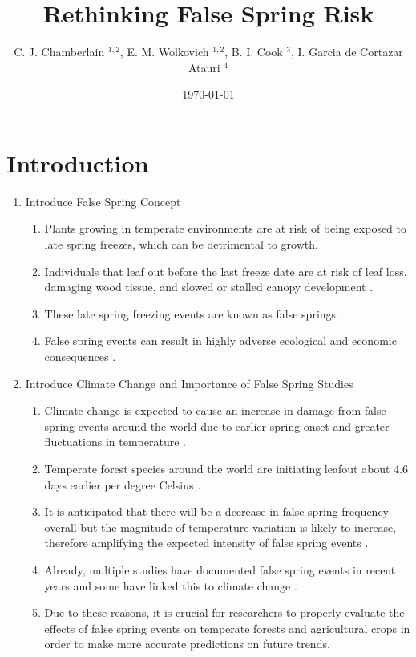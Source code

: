 \documentclass{article}\usepackage[]{graphicx}\usepackage[]{color}
\begin{document}
\title{Rethinking False Spring Risk}
\author{C. J. Chamberlain $^{1,2}$, E. M. Wolkovich $^{1,2}$, B. I. Cook $^{3}$, I. Garcia de Cortazar Atauri $^{4}$}
\date{\today}
\maketitle 
 

\renewcommand{\thetable}{\arabic{table}}
\renewcommand{\thefigure}{\arabic{figure}}
\renewcommand{\labelitemi}{$-$}

\section*{Introduction}
\begin{enumerate}
\item Introduce False Spring Concept
\begin {enumerate}
\item Plants growing in temperate environments are at risk of being exposed to late spring freezes, which can be detrimental to growth. 
\item Individuals that leaf out before the last freeze date are at risk of leaf loss, damaging wood tissue, and slowed or stalled canopy development \citep{Gu2008, Hufkens2012}. 
\item These late spring freezing events are known as false springs. 
\item False spring events can result in highly adverse ecological and economic consequences \citep{Knudson2012, Ault2013}.
\end{enumerate}

\item Introduce Climate Change and Importance of False Spring Studies
\begin{enumerate}
\item Climate change is expected to cause an increase in damage from false spring events around the world due to earlier spring onset and greater fluctuations in temperature \citep{Cannell1986, Inouye2008, Martin2010}. 
\item Temperate forest species around the world are initiating leafout about 4.6 days earlier per degree Celsius \citep{Wolkovich2012, Polgar2014}. 
\item It is anticipated that there will be a decrease in false spring frequency overall but the magnitude of temperature variation is likely to increase, therefore amplifying the expected intensity of false spring events \citep{Kodra2011, Allstadt2015}. 
\item Already, multiple studies have documented false spring events in recent years \citep{Gu2008, Augspurger2009, Knudson2012, Augspurger2013} and some have linked this to climate change \citep{Ault2013, Allstadt2015, Muffler2016, Xin2016}. 
\item Due to these reasons, it is crucial for researchers to properly evaluate the effects of false spring events on temperate forests and agricultural crops in order to make more accurate predictions on future trends.
\end{enumerate}


\end{enumerate}
\end{document}

